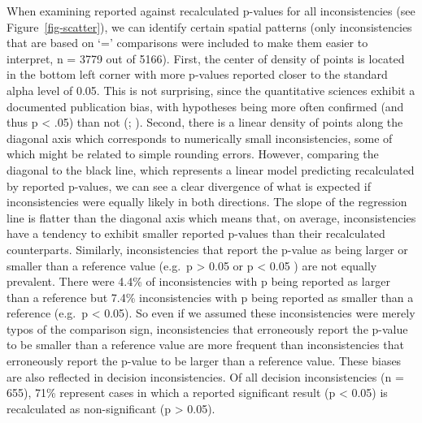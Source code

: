 \documentclass[
  doc,
  longtable,
  nolmodern,
  notxfonts,
  notimes,
  colorlinks=true,linkcolor=blue,citecolor=blue,urlcolor=blue]{apa7}
\begin{document}
When examining reported against recalculated p-values for all
inconsistencies (see Figure~\ref{fig-scatter}), we can identify certain
spatial patterns (only inconsistencies that are based on `=' comparisons
were included to make them easier to interpret, n = 3779 out of 5166).
First, the center of density of points is located in the bottom left
corner with more p-values reported closer to the standard alpha level of
0.05. This is not surprising, since the quantitative sciences exhibit a
documented publication bias, with hypotheses being more often confirmed
(and thus p \textless{} .05) than not
(;
). Second, there
is a linear density of points along the diagonal axis which corresponds
to numerically small inconsistencies, some of which might be related to
simple rounding errors. However, comparing the diagonal to the black
line, which represents a linear model predicting recalculated by
reported p-values, we can see a clear divergence of what is expected if
inconsistencies were equally likely in both directions. The slope of the
regression line is flatter than the diagonal axis which means that, on
average, inconsistencies have a tendency to exhibit smaller reported
p-values than their recalculated counterparts. Similarly,
inconsistencies that report the p-value as being larger or smaller than
a reference value (e.g.~p \textgreater{} 0.05 or p \textless{} 0.05 )
are not equally prevalent. There were 4.4\% of inconsistencies with p
being reported as larger than a reference but 7.4\% inconsistencies with
p being reported as smaller than a reference (e.g.~p \textless{} 0.05).
So even if we assumed these inconsistencies were merely typos of the
comparison sign, inconsistencies that erroneously report the p-value to
be smaller than a reference value are more frequent than inconsistencies
that erroneously report the p-value to be larger than a reference value.
These biases are also reflected in decision inconsistencies. Of all
decision inconsistencies (n = 655), 71\% represent cases in which a
reported significant result (p \textless{} 0.05) is recalculated as
non-significant (p \textgreater{} 0.05).
\end{document}
